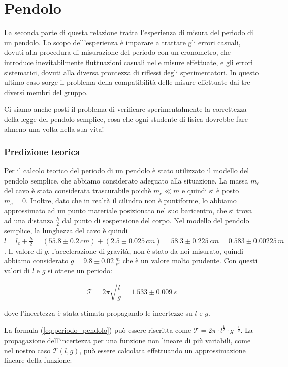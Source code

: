 \newpage

\section{Pendolo}

La seconda parte di questa relazione tratta l'esperienza di misura del periodo
di un pendolo. Lo scopo dell'esperienza è imparare a trattare gli errori
casuali, dovuti alla procedura di misurazione del periodo con un cronometro,
che introduce inevitabilmente fluttuazioni casuali nelle misure effettuate,
e gli errori sistematici, dovuti alla diversa prontezza di riflessi degli
sperimentatori. In questo ultimo caso sorge il problema della 
compatibilità delle misure effettuate dai tre diversi membri del gruppo.

Ci siamo anche posti il problema di verificare sperimentalmente la
correttezza della legge del pendolo semplice, cosa che ogni studente di
fisica dovrebbe fare almeno una volta nella sua vita!

\subsubsection{Predizione teorica}

Per il calcolo teorico del periodo di un pendolo è stato utilizzato il modello del pendolo
semplice, che abbiamo considerato adeguato alla situazione. La massa $m_c$ del
cavo è stata considerata trascurabile poichè $m_c \ll m$ e quindi si è posto
$m_c = 0$. Inoltre, dato che in realtà il cilindro non è puntiforme, lo abbiamo approssimato ad un punto
materiale posizionato nel suo baricentro, che si trova ad una distanza
$\frac{h}{2}$ dal punto di sospensione del corpo.
Nel modello del pendolo semplice, la lunghezza del cavo è quindi
$l = l_c + \frac{h}{2} = (55.8 \pm 0.2 \, cm) + (2.5 \pm 0.025 \, cm) = 58.3 \pm 0.225 \, cm = 0.583 \pm 0.00225 \, m$.
Il valore di $g$, l'accelerazione di gravità, non è stato da noi misurato,
quindi abbiamo considerato $g = 9.8 \pm 0.02 \, \frac{m}{s^2}$ che è un
valore molto prudente. Con questi valori di $l$ e $g$ si ottene un periodo:

\begin{equation}
    \mathcal{T} = 2\pi \sqrt{\frac{l}{g}} = 1.533 \pm 0.009 \, s 
    \label{eq:periodo_pendolo}
\end{equation}

dove l'incertezza è stata stimata propagando le incertezze su $l$ e $g$.

La formula (\ref{eq:periodo_pendolo}) può essere riscritta come $\mathcal{T} = 2 \pi \cdot l^{\frac{1}{2}} \cdot g^{-\frac{1}{2}}$.
La propagazione dell'incertezza per una funzione non lineare di più variabili, come nel nostro
caso $\mathcal{T}(l, g)$, può essere calcolata effettuando un approssimazione lineare della funzione:

